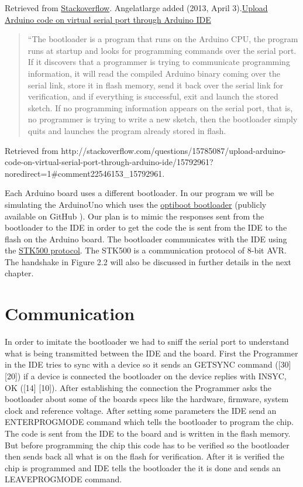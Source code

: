 Retrieved from \href{http://stackoverflow.com/questions/15785087/upload-arduino-code-on-virtual-serial-port-through-arduino-ide/15792961?noredirect=1#comment22546153_15792961}{Stackoverflow}. 
Angelatlarge added  (2013, April 3).\href{http://stackoverflow.com/questions/15785087/upload-arduino-code-on-virtual-serial-port-through-arduino-ide/15792961?noredirect=1#comment22546153_15792961}{Upload Arduino code on virtual serial port through Arduino IDE} \begin{quotation}``The bootloader is a program that runs on the Arduino CPU, the program runs at startup and looks for programming commands over the serial port. If it discovers that a programmer is trying to communicate programming information, it will read the compiled Arduino binary coming over the serial link, store it in flash memory, send it back over the serial link for verification, and if everything is successful, exit and launch the stored sketch. If no programming information appears on the serial port, that is, no programmer is trying to write a new sketch, then the bootloader simply quits and launches the program already stored in flash.\end{quotation} Retrieved from http://stackoverflow.com/questions/15785087/upload-arduino-code-on-virtual-serial-port-through-arduino-ide/15792961?noredirect=1#comment22546153_15792961. 

Each Arduino board uses a different bootloader. In our program we will be simulating the ArduinoUno which uses the \href{https://github.com/arduino/Arduino/tree/master/hardware/arduino/bootloaders/optiboot}{optiboot bootloader} (publicly available on GitHub \cite{GitHub:URL}). Our plan is to mimic the responses sent from the bootloader to the IDE in order to get the code the is sent from the IDE to the flash on the Arduino board. The bootloader communicates with the IDE using the \href{http://www.atmel.com/Images/doc2525.pdf}{STK500 protocol}. The STK500 is a communication protocol of 8-bit AVR. The handshake in Figure 2.2 will also be discussed in further details in the next chapter.

\section{Communication}
In order to imitate the bootloader we had to sniff the serial port to understand what is being transmitted between the IDE and the board. First the Programmer in the IDE tries to sync with a device so it sends an GETSYNC command ([30] [20]) if a device is connected the bootloader on the device replies with INSYC, OK ([14] [10]). After establishing the connection the Programmer asks the bootloader about some of the boards specs like the hardware, firmware, system clock and reference voltage. After setting some parameters the IDE send an ENTERPROGMODE command which tells the bootloader to program the chip. The code is sent from the IDE to the board and is written in the flash memory. But before programming the chip this code has to be verified so the bootloader then sends back all what is on the flash for verification. After it is verified the chip is programmed and IDE tells the bootloader the it is done and sends an LEAVEPROGMODE command.


